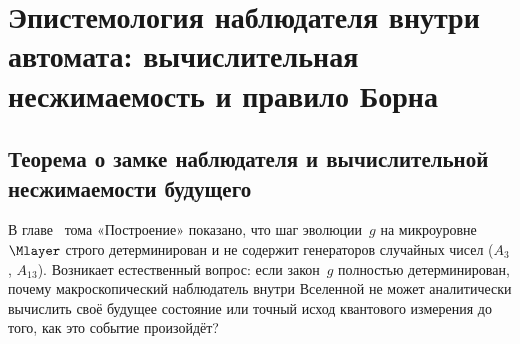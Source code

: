 \chapter{Эпистемология наблюдателя внутри автомата: вычислительная несжимаемость и правило Борна}
\label{ch:observer-epistemology-born}

\section{Теорема о замке наблюдателя и вычислительной несжимаемости будущего}
\label{sec:observer-lock-incompressibility}

В главе~ тома «Построение» показано, что шаг эволюции~$g$ на микроуровне~$\Mlayer$ строго детерминирован и не содержит генераторов случайных чисел ($A_3$, $A_{13}$).
Возникает естественный вопрос: если закон~$g$ полностью детерминирован, почему макроскопический наблюдатель внутри Вселенной не может аналитически вычислить своё будущее состояние или точный исход квантового измерения до того, как это событие произойдёт?

